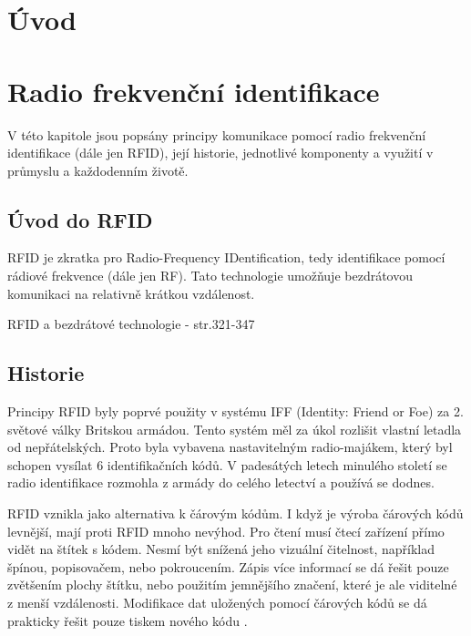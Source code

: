 
\chapter{Úvod}
\label{uvod}


\chapter{Radio frekvenční identifikace}
\label{technologie_rfid}
V této kapitole jsou popsány principy komunikace pomocí radio frekvenční identifikace (dále jen RFID), její historie, jednotlivé komponenty a využití v průmyslu a každodenním životě.

\section{Úvod do RFID}
RFID je zkratka pro {Radio-Frequency IDentification}, tedy identifikace pomocí rádiové frekvence (dále jen RF). Tato technologie umožňuje bezdrátovou komunikaci na relativně krátkou vzdálenost\cite{The_RF_in_RFID}.
\par
RFID a bezdrátové technologie \cite{Smart_Cards_Tokens_Security}{ - str.321-347}

\section{Historie}
Principy RFID byly poprvé použity v systému IFF (Identity: Friend or Foe) za 2. světové války Britskou armádou. Tento systém měl za úkol rozlišit vlastní letadla od nepřátelských. Proto byla vybavena nastavitelným {radio-majákem}, který byl schopen vysílat 6 identifikačních kódů. V padesátých letech minulého století se radio identifikace rozmohla z armády do celého letectví a používá se dodnes. %
\par
RFID vznikla jako alternativa k čárovým kódům. I když je výroba čárových kódů levnější, mají proti RFID mnoho nevýhod. Pro čtení musí čtecí zařízení přímo vidět na štítek s kódem. Nesmí být snížená jeho vizuální čitelnost, například špínou, popisovačem, nebo pokroucením. Zápis více informací se dá řešit pouze zvětšením plochy štítku, nebo použitím jemnějšího značení, které je ale viditelné z menší vzdálenosti. Modifikace dat uložených pomocí čárových kódů se dá prakticky řešit pouze tiskem nového kódu \cite{The_RF_in_RFID}\cite{Emulator_UHD_RFID_Tagu}.

